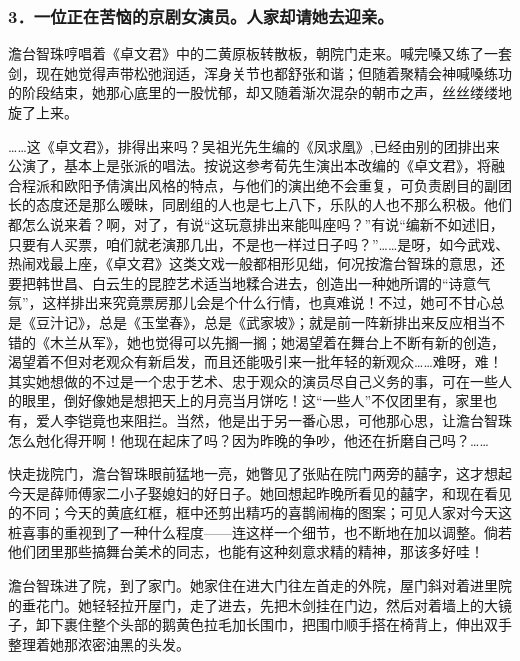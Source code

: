 \subsubsection*{3．一位正在苦恼的京剧女演员。人家却请她去迎亲。}
\par 澹台智珠哼唱着《卓文君》中的二黄原板转散板，朝院门走来。喊完嗓又练了一套剑，现在她觉得声带松弛润适，浑身关节也都舒张和谐；但随着聚精会神喊嗓练功的阶段结束，她那心底里的一股忧郁，却又随着渐次混杂的朝市之声，丝丝缕缕地旋了上来。
\par ……这《卓文君》，排得出来吗？吴祖光先生编的《凤求凰》,已经由别的团排出来公演了，基本上是张派的唱法。按说这参考荀先生演出本改编的《卓文君》，将融合程派和欧阳予倩演出风格的特点，与他们的演出绝不会重复，可负责剧目的副团长的态度还是那么暧昧，同剧组的人也是七上八下，乐队的人也不那么积极。他们都怎么说来着？啊，对了，有说“这玩意排出来能叫座吗？”有说“编新不如述旧，只要有人买票，咱们就老演那几出，不是也一样过日子吗？”……是呀，如今武戏、热闹戏最上座，《卓文君》这类文戏一般都相形见绌，何况按澹台智珠的意思，还要把韩世昌、白云生的昆腔艺术适当地糅合进去，创造出一种她所谓的“诗意气氛”，这样排出来究竟票房那儿会是个什么行情，也真难说！不过，她可不甘心总是《豆汁记》，总是《玉堂春》，总是《武家坡》；就是前一阵新排出来反应相当不错的《木兰从军》，她也觉得可以先搁一搁；她渴望着在舞台上不断有新的创造，渴望着不但对老观众有新启发，而且还能吸引来一批年轻的新观众……难呀，难！其实她想做的不过是一个忠于艺术、忠于观众的演员尽自己义务的事，可在一些人的眼里，倒好像她是想把天上的月亮当月饼吃！这“一些人”不仅团里有，家里也有，爱人李铠竟也来阻拦。当然，他是出于另一番心思，可他那心思，让澹台智珠怎么尅化得开啊！他现在起床了吗？因为昨晚的争吵，他还在折磨自己吗？……
\par 快走拢院门，澹台智珠眼前猛地一亮，她瞥见了张贴在院门两旁的囍字，这才想起今天是薛师傅家二小子娶媳妇的好日子。她回想起昨晚所看见的囍字，和现在看见的不同；今天的黄底红框，框中还剪出精巧的喜鹊闹梅的图案；可见人家对今天这桩喜事的重视到了一种什么程度——连这样一个细节，也不断地在加以调整。倘若他们团里那些搞舞台美术的同志，也能有这种刻意求精的精神，那该多好哇！
\par 澹台智珠进了院，到了家门。她家住在进大门往左首走的外院，屋门斜对着进里院的垂花门。她轻轻拉开屋门，走了进去，先把木剑挂在门边，然后对着墙上的大镜子，卸下裹住整个头部的鹅黄色拉毛加长围巾，把围巾顺手搭在椅背上，伸出双手整理着她那浓密油黑的头发。
